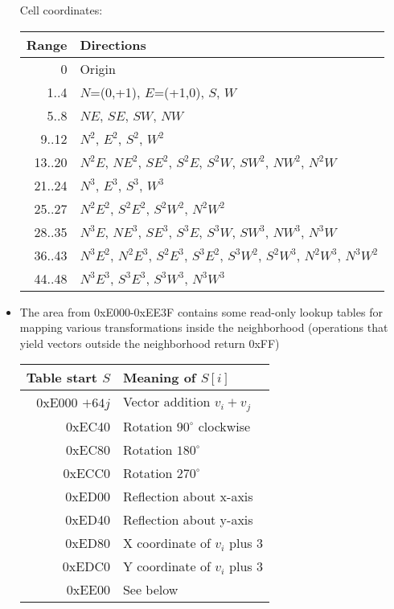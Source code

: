 \documentclass{article}
\begin{document}
\begin{itemize}
 \noindent
 Cell coordinates:

 \noindent
 \begin{tabular}{r|p{}}
 Range & Directions \\ \hline
 0 & Origin \\
 1..4 & $N$=(0,+1), $E$=(+1,0), $S$, $W$ \\
 5..8 & $NE$, $SE$, $SW$, $NW$ \\
 9..12 & $N^2$, $E^2$, $S^2$, $W^2$ \\
 13..20 & $N^2E$, $NE^2$, $SE^2$, $S^2E$, $S^2W$, $SW^2$, $NW^2$, $N^2W$ \\
 21..24 & $N^3$, $E^3$, $S^3$, $W^3$ \\
 25..27 & $N^2E^2$, $S^2E^2$, $S^2W^2$, $N^2W^2$ \\
 28..35 & $N^3E$, $NE^3$, $SE^3$, $S^3E$, $S^3W$, $SW^3$, $NW^3$, $N^3W$ \\
 36..43 & $N^3E^2$, $N^2E^3$, $S^2E^3$, $S^3E^2$, $S^3W^2$, $S^2W^3$, $N^2W^3$, $N^3W^2$ \\
 44..48 & $N^3E^3$, $S^3E^3$, $S^3W^3$, $N^3W^3$
 \end{tabular}


\item The area from 0xE000-0xEE3F contains some read-only lookup tables for mapping various transformations inside the neighborhood (operations that yield vectors outside the neighborhood return 0xFF)

\noindent
  \begin{tabular}{r|l}
    Table start $S$ & Meaning of $S[i]$ \\ \hline
    0xE000 $+ 64j$  & Vector addition $v_i + v_j$ \\
    0xEC40  & Rotation $90^\circ$ clockwise \\
    0xEC80  & Rotation $180^\circ$ \\
    0xECC0  & Rotation $270^\circ$ \\
    0xED00  & Reflection about x-axis \\
    0xED40  & Reflection about y-axis \\
    0xED80  & X coordinate of $v_i$ plus 3 \\
    0xEDC0  & Y coordinate of $v_i$ plus 3 \\
    0xEE00  & See below
  \end{tabular}


\end{itemize}
\end{document}
